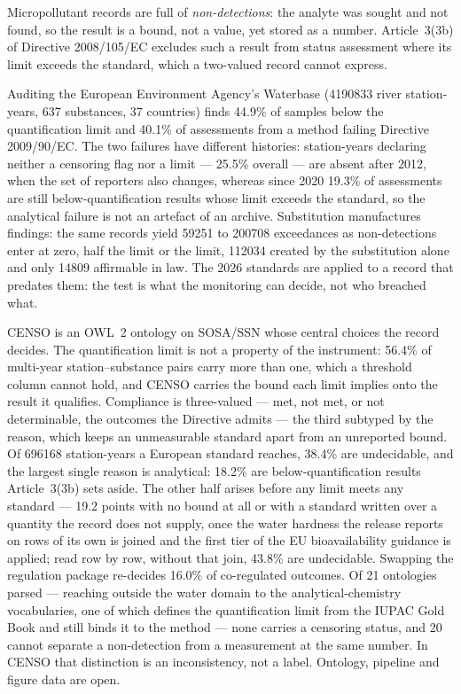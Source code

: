 Micropollutant records are full of \emph{non-detections}: the analyte was
sought and not found, so the result is a bound, not a value, yet stored as a
number. Article~3(3b) of Directive 2008/105/EC excludes such a result from
status assessment where its limit exceeds the standard, which a two-valued
record cannot express.

Auditing the European Environment Agency's Waterbase (\num{4190833} river
station-years, \num{637} substances, \num{37} countries) finds \num{44.9}\% of
samples below the quantification limit and \num{40.1}\% of assessments from a
method failing Directive 2009/90/EC. The two failures have different histories:
station-years declaring neither a censoring flag nor a limit --- \num{25.5}\%
overall --- are absent after \num{2012}, when the set of reporters also changes,
whereas since \num{2020} \num{19.3}\% of assessments are still below-quantification
results whose limit exceeds the standard, so the analytical failure is not an
artefact of an archive. Substitution manufactures findings: the same records yield
\num{59251} to \num{200708} exceedances as non-detections enter at zero, half
the limit or the limit, \num{112034} created by the substitution alone and only
\num{14809} affirmable in law. The \num{2026} standards are applied to a record that
predates them: the test is what the monitoring can decide, not who breached
what.

CENSO is an OWL~2 ontology on SOSA/SSN whose central choices the record decides.
The quantification limit is not a property of the instrument: \num{56.4}\% of
multi-year station--substance pairs carry more than one, which a threshold column
cannot hold, and CENSO carries the bound each limit implies onto the result it
qualifies. Compliance is three-valued --- met, not met, or not determinable, the
outcomes the Directive admits --- the third subtyped by the reason, which keeps
an unmeasurable standard apart from an unreported bound. Of \num{696168}
station-years a European standard reaches, \num{38.4}\% are undecidable, and the
largest single reason is analytical: \num{18.2}\% are below-quantification results
Article~3(3b) sets aside. The other half arises before any limit meets any
standard --- \num{19.2} points with no bound at all or with a standard written
over a quantity the record does not supply, once the water hardness the release
reports on rows of its own is joined and the first tier of the EU bioavailability
guidance is applied; read row by row, without that join, \num{43.8}\% are
undecidable. Swapping the regulation package re-decides
\num{16.0}\% of co-regulated outcomes. Of \num{21} ontologies parsed --- reaching outside the water domain to
the analytical-chemistry vocabularies, one of which defines the quantification
limit from the IUPAC Gold Book and still binds it to the method --- none carries
a censoring status, and \num{20} cannot separate a non-detection from a
measurement at the same number. In CENSO that distinction is an inconsistency,
not a label. Ontology, pipeline and figure data are open.
